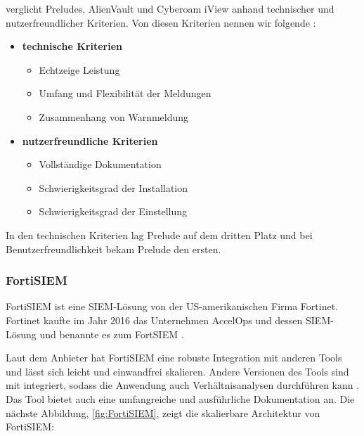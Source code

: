 \cite{Grammatikis_Prelude} verglicht Preludes, AlienVault und Cyberoam iView anhand technischer und nutzerfreundlicher Kriterien. Von diesen Kriterien nennen wir folgende \citep{Grammatikis_Prelude}:

\begin{itemize}[noitemsep]
   \item \textbf{technische Kriterien}
   \begin{itemize}[noitemsep]
      \item Echtzeige Leistung %
      \item Umfang und Flexibilität der Meldungen %
      \item Zusammenhang von Warnmeldung %
   \end{itemize}

   \item \textbf{nutzerfreundliche Kriterien}
   \begin{itemize}[noitemsep]
      \item Vollständige Dokumentation %
      \item Schwierigkeitsgrad der Installation %
      \item Schwierigkeitsgrad der Einstellung %
   \end{itemize}
\end{itemize}

In den technischen Kriterien lag Prelude auf dem dritten Platz und bei Benutzerfreundlichkeit bekam Prelude den ersten.



\newpage
\subsubsection{FortiSIEM}
FortiSIEM ist eine \gls{SIEM}-Lösung von der US-amerikanischen Firma Fortinet. Fortinet kaufte im Jahr 2016 das Unternehmen AccelOps und dessen \gls{SIEM}-Lösung und benannte es zum FortSIEM \citep{Fortinet_Press}.

Laut dem Anbieter hat FortiSIEM eine robuste Integration mit anderen Tools und lässt sich leicht und einwandfrei skalieren. Andere Versionen des Tools sind mit  integriert, sodass die Anwendung auch Verhältnisanalysen durchführen kann \citep{Fortinet_Solutions}. Das Tool bietet auch eine umfangreiche und ausführliche Dokumentation an. Die nächste Abbildung, \ref{fig:FortiSIEM}, zeigt die skalierbare Architektur von FortiSIEM:

